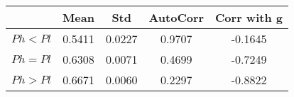 \begin{tiny}\begin{tabular}{|l|c|c|c|c|}
\hline
&\textbf{Mean}&\textbf{Std}&\textbf{AutoCorr}&\textbf{Corr with g}\\\hline
\textbf{$Ph<Pl$}&0.5411&0.0227&0.9707&-0.1645\\\hline
\textbf{$Ph=Pl$}&0.6308&0.0071&0.4699&-0.7249\\\hline
\textbf{$Ph>Pl$}&0.6671&0.0060&0.2297&-0.8822\\\hline
\end{tabular}
\end{tiny}